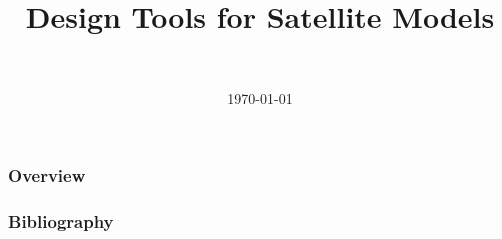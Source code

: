 \documentclass[]{beamer}
\title
[Design Tools for Satellite Models]
{Design Tools for Satellite Models}
\author[Daniel Topa]{\TopaHII \\ \TopaHIIEmail}
\institute{\missiontech}
\date{\today}
\begin{document}
%

\begin{frame}
	\titlepage
\end{frame}

\begin{frame}\frametitle{Overview}
	\tableofcontents[hideallsubsections]
\end{frame}

	
%	
%	
	

{\tiny{
\begin{frame}[allowframebreaks]\frametitle{Bibliography}
	\printbibliography
\end{frame}}}

\begin{frame}
	\titlepage
\end{frame}
\end{document}
